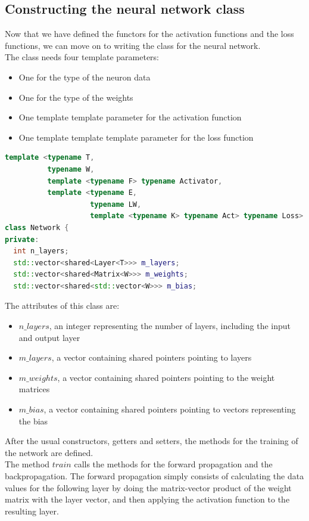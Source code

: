 \documentclass[12pt]{article}
\begin{document}
\subsection{Constructing the neural network class}
Now that we have defined the functors for the activation functions and the loss functions, we can move on to
writing the class for the neural network. \\
The class needs four template parameters:
\begin{itemize}
  \item One for the type of the neuron data
  \item One for the type of the weights
  \item One template template parameter for the activation function
  \item One template template template parameter for the loss function
\end{itemize}
\begin{lstlisting}[language=C++]
template <typename T,
          typename W,
          template <typename F> typename Activator,
          template <typename E, 
					typename LW, 
					template <typename K> typename Act> typename Loss>
class Network {
private:
  int n_layers;
  std::vector<shared<Layer<T>>> m_layers;
  std::vector<shared<Matrix<W>>> m_weights;
  std::vector<shared<std::vector<W>>> m_bias;
\end{lstlisting}
The attributes of this class are:
\begin{itemize}
  \item $n\_layers$, an integer representing the number of layers, including the input and output layer
  \item $m\_layers$, a vector containing shared pointers pointing to layers
  \item $m\_weights$, a vector containing shared pointers pointing to the weight matrices
  \item $m\_bias$, a vector containing shared pointers pointing to vectors representing the bias
\end{itemize}
After the usual constructors, getters and setters, the methods for the training of the network are defined. \\
The method $train$ calls the methods for the forward propagation and the backpropagation. The forward 
propagation simply consists of calculating the data values for the following layer by doing the matrix-vector 
product of the weight matrix with the layer vector, and then applying the activation function to the 
resulting layer.
\end{document}
